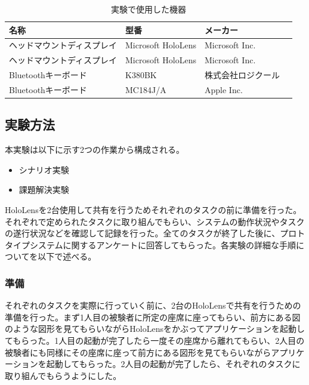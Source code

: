 \documentclass[11pt,a4j, titlepage]{jarticle} %
\begin{document}
\begin{table}[H]
\caption{実験で使用した機器}
\label{table:jikken_kiki}
\begin{center}
\begin{tabular}{|l|l|l|}
\hline
名称 & 型番 & メーカー \\
\hline\hline
ヘッドマウントディスプレイ & Microsoft HoloLens & Microsoft Inc. \\
\hline
ヘッドマウントディスプレイ & Microsoft HoloLens & Microsoft Inc. \\
\hline
Bluetoothキーボード & K380BK & 株式会社ロジクール　\\
\hline
Bluetoothキーボード & MC184J/A & Apple Inc. \\
\hline
\end{tabular}
\end{center}
\end{table}

\subsection{実験方法}
本実験は以下に示す2つの作業から構成される。

\begin{itemize}
 \item シナリオ実験
 \item 課題解決実験
\end{itemize}

HoloLensを2台使用して共有を行うためそれぞれのタスクの前に準備を行った。それぞれで定められたタスクに取り組んでもらい、システムの動作状況やタスクの遂行状況などを確認して記録を行った。全てのタスクが終了した後に、プロトタイプシステムに関するアンケートに回答してもらった。各実験の詳細な手順についてを以下で述べる。

\subsubsection{準備}
それぞれのタスクを実際に行っていく前に、2台のHoloLensで共有を行うための準備を行った。まず1人目の被験者に所定の座席に座ってもらい、前方にある図のような図形を見てもらいながらHoloLensをかぶってアプリケーションを起動してもらった。1人目の起動が完了したら一度その座席から離れてもらい、2人目の被験者にも同様にその座席に座って前方にある図形を見てもらいながらアプリケーションを起動してもらった。2人目の起動が完了したら、それぞれのタスクに取り組んでもらうようにした。
\end{document}
